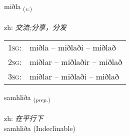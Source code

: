 \documentclass[frontgrid, backgrid]{flacards}\usepackage[]{graphicx}\usepackage[]{color}
\begin{document}
\renewcommand{\flhead}{\vskip5pt \fboxsep=0pt {\small\bfseries\footnotesize Sagnorð | 动词}}
\renewcommand{\fcfoot}{\vskip5pt \fboxsep=0pt \hspace{2pt}{\small\bfseries\footnotesize 2K}}

\renewcommand{\blhead}{\vskip5pt {\small\bfseries\footnotesize Sagnorð | 动词 }}
\renewcommand{\bcfoot}{\vskip5pt \hspace{2pt}{\small\bfseries\footnotesize 2K}}


{miðla \small{\textsubscript{(\textit{v.})}} \\[1ex] %
\textphonetic{[mɪðla]} \\
zh: \emph{交流;分享，分发} \\  [2ex]
\renewcommand*{\arraystretch}{0.8}
\begin{tabular}{p{1cm}l}
\textsc{1sg}: & miðla -- miðlaði -- miðlað \\ 
\textsc{2sg}: & miðlar -- miðlaðir -- miðlað \\ 
\textsc{3sg}: & miðlar -- miðlaði -- miðlað \\ 
\end{tabular}
}


\renewcommand{\flhead}{\vskip5pt \fboxsep=0pt {\small\bfseries\footnotesize Forsetning | 介词}}
\renewcommand{\fcfoot}{\vskip5pt \fboxsep=0pt \hspace{2pt}{\small\bfseries\footnotesize 2K}}

\renewcommand{\blhead}{\vskip5pt {\small\bfseries\footnotesize Forsetning | 介词 }}
\renewcommand{\bcfoot}{\vskip5pt \hspace{2pt}{\small\bfseries\footnotesize 2K}}


{samhliða \small{\textsubscript{(\textit{prep.})}} \\[1ex]
 \\
zh: \emph{在平行下} \\  [2ex]
samhliða (Indeclinable)}
\end{document}
